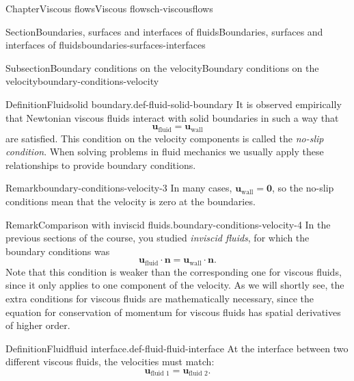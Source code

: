 \documentclass[oneside,10pt,]{book}
\numberwithin{equation}{section}
\newcommand{\bn}{\boldsymbol{n}}
\newcommand{\bu}{\boldsymbol{u}}
\begin{document}
\begin{chapterptx}{Chapter}{Viscous flows}{}{Viscous flows}{}{}{ch-viscousflows}
\begin{sectionptx}{Section}{Boundaries, surfaces and interfaces of fluids}{}{Boundaries, surfaces and interfaces of fluids}{}{}{boundaries-surfaces-interfaces}
\begin{introduction}{}
\begin{itemize}[label=\textbullet]
\end{itemize}
%
\end{introduction}%
%
%
\typeout{************************************************}
\typeout{************************************************}
%
\begin{subsectionptx}{Subsection}{Boundary conditions on the velocity}{}{Boundary conditions on the velocity}{}{}{boundary-conditions-velocity}
\begin{definition}{Definition}{Fluid\textendash{}solid boundary.}{def-fluid-solid-boundary}%
It is observed empirically that Newtonian viscous fluids interact with solid boundaries in such a way that%
\begin{equation*}
\bu_{\textrm{fluid}} = \bu_{\textrm{wall}}
\end{equation*}
are satisfied. This condition on the velocity components is called the \emph{no-slip condition}. When solving problems in fluid mechanics we usually apply these relationships to provide boundary conditions.%
\end{definition}
\begin{remark}{Remark}{}{boundary-conditions-velocity-3}%
In many cases, \(\bu_{\textrm{wall}} = \boldsymbol{0}\), so the no-slip conditions mean that the velocity is zero at the boundaries.%
\end{remark}
\begin{remark}{Remark}{Comparison with inviscid fluids.}{boundary-conditions-velocity-4}%
In the previous sections of the course, you studied \emph{inviscid fluids}, for which the boundary conditions was%
\begin{equation*}
\bu_{\textrm{fluid}}\cdot\bn=\bu_{\textrm{wall}}\cdot\bn.
\end{equation*}
Note that this condition is weaker than the corresponding one for viscous fluids, since it only applies to one component of the velocity. As we will shortly see, the extra conditions for viscous fluids are mathematically necessary, since the equation for conservation of momentum for viscous fluids has spatial derivatives of higher order.%
\end{remark}
\begin{definition}{Definition}{Fluid\textendash{}fluid interface.}{def-fluid-fluid-interface}%
At the interface between two different viscous fluids, the velocities must match:%
\begin{equation*}
\bu_{\textrm{fluid 1}} = \bu_{\textrm{fluid 2}}.
\end{equation*}

\end{definition}
\end{subsectionptx}
\end{sectionptx}
\end{chapterptx}
\end{document}
